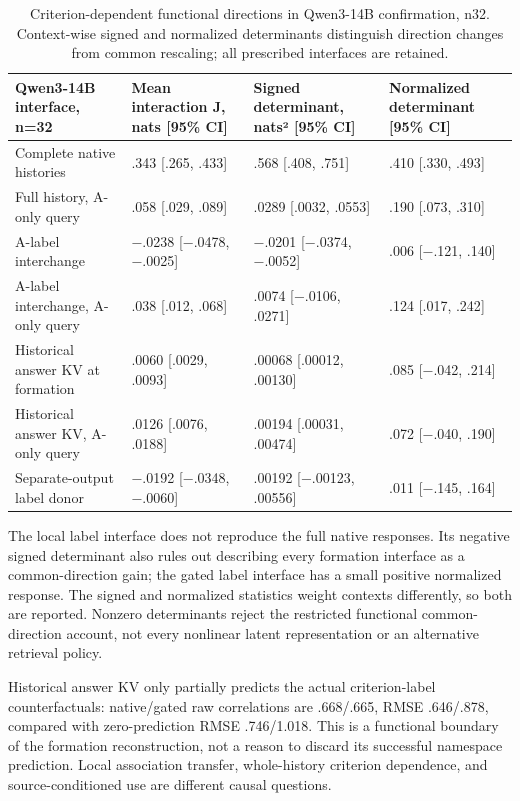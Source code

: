 \documentclass[11pt]{article}
\begin{document}
\begin{table}[t]
\small
\begin{tabularx}{\textwidth}{>{\raggedright\arraybackslash}X>{\raggedleft\arraybackslash}X>{\raggedleft\arraybackslash}X>{\raggedleft\arraybackslash}X}
\toprule
Qwen3-14B interface, n=32 & Mean interaction J, nats {[}95\% CI{]} & Signed determinant, nats² {[}95\% CI{]} & Normalized determinant {[}95\% CI{]} \\
\midrule
Complete native histories & .343 {[}.265, .433{]} & .568 {[}.408, .751{]} & .410 {[}.330, .493{]} \\
Full history, A-only query & .058 {[}.029, .089{]} & .0289 {[}.0032, .0553{]} & .190 {[}.073, .310{]} \\
A-label interchange & −.0238 {[}−.0478, −.0025{]} & −.0201 {[}−.0374, −.0052{]} & .006 {[}−.121, .140{]} \\
A-label interchange, A-only query & .038 {[}.012, .068{]} & .0074 {[}−.0106, .0271{]} & .124 {[}.017, .242{]} \\
Historical answer KV at formation & .0060 {[}.0029, .0093{]} & .00068 {[}.00012, .00130{]} & .085 {[}−.042, .214{]} \\
Historical answer KV, A-only query & .0126 {[}.0076, .0188{]} & .00194 {[}.00031, .00474{]} & .072 {[}−.040, .190{]} \\
Separate-output label donor & −.0192 {[}−.0348, −.0060{]} & .00192 {[}−.00123, .00556{]} & .011 {[}−.145, .164{]} \\
\bottomrule
\end{tabularx}
\caption{Criterion-dependent functional directions in Qwen3-14B confirmation, n32. Context-wise signed and normalized determinants distinguish direction changes from common rescaling; all prescribed interfaces are retained.}
\end{table}

The local label interface does not reproduce the full native responses. Its negative signed determinant also rules out describing every formation interface as a common-direction gain; the gated label interface has a small positive normalized response. The signed and normalized statistics weight contexts differently, so both are reported. Nonzero determinants reject the restricted functional common-direction account, not every nonlinear latent representation or an alternative retrieval policy.

Historical answer KV only partially predicts the actual criterion-label counterfactuals: native/gated raw correlations are .668/.665, RMSE .646/.878, compared with zero-prediction RMSE .746/1.018. This is a functional boundary of the formation reconstruction, not a reason to discard its successful namespace prediction. Local association transfer, whole-history criterion dependence, and source-conditioned use are different causal questions.
\end{document}
